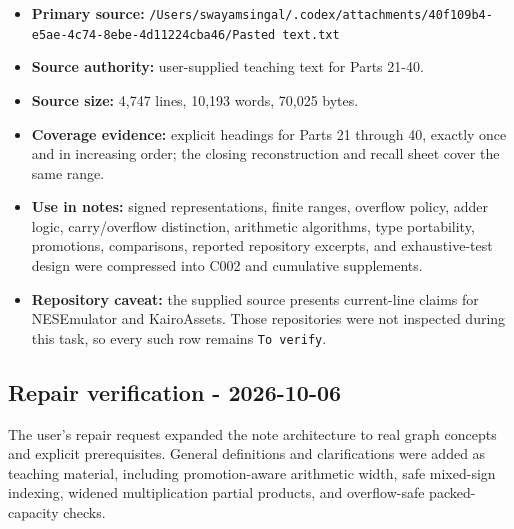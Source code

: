 \hypertarget{appendix-a103e7846d21-c002---m002-source-record}{}

\begin{itemize}
\tightlist
\item
  \textbf{Primary source:} \texttt{/Users/swayamsingal/.codex/attachments/40f109b4-e5ae-4c74-8ebe-4d11224cba46/Pasted\ text.txt}
\item
  \textbf{Source authority:} user-supplied teaching text for Parts 21-40.
\item
  \textbf{Source size:} 4,747 lines, 10,193 words, 70,025 bytes.
\item
  \textbf{Coverage evidence:} explicit headings for Parts 21 through 40, exactly once and in increasing order; the closing reconstruction and recall sheet cover the same range.
\item
  \textbf{Use in notes:} signed representations, finite ranges, overflow policy, adder logic, carry/overflow distinction, arithmetic algorithms, type portability, promotions, comparisons, reported repository excerpts, and exhaustive-test design were compressed into C002 and cumulative supplements.
\item
  \textbf{Repository caveat:} the supplied source presents current-line claims for NESEmulator and KairoAssets. Those repositories were not inspected during this task, so every such row remains \texttt{To\ verify}.
\end{itemize}

\subsection{Repair verification - 2026-10-06}\label{appendix-a103e7846d21-repair-verification---2026-10-06}

\hypertarget{appendix-a103e7846d21-repair-verification---2026-10-06}{}

The user's repair request expanded the note architecture to real graph concepts and explicit prerequisites. General definitions and clarifications were added as teaching material, including promotion-aware arithmetic width, safe mixed-sign indexing, widened multiplication partial products, and overflow-safe packed-capacity checks.


